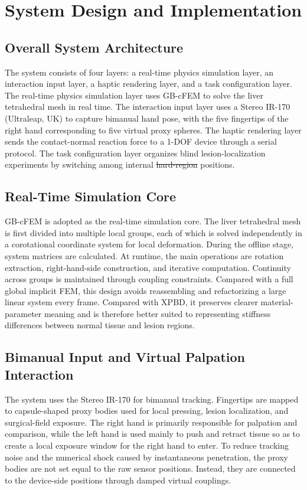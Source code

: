 \documentclass{ieeeaccess}
\makeatletter
\providecommand{\DIFadd}[1]{{\protect\color{blue}\uwave{#1}}} %
\providecommand{\DIFdel}[1]{{\protect\color{red}\sout{#1}}} %
\providecommand{\DIFaddbegin}{} %
\providecommand{\DIFaddend}{} %
\providecommand{\DIFdelbegin}{} %
\providecommand{\DIFdelend}{} %
\newcommand{\DIFscaledelfig}{0.5}
\newlength{\DIFdelgraphicswidth} %
\newlength{\DIFdelgraphicsheight} %
\newcommand{\DIFaddincludegraphics}[2][]{{\color{blue}\fbox{\DIFOincludegraphics[#1]{#2}}}} %
\newcommand{\DIFdelincludegraphics}[2][]{%
\sbox{\DIFdelgraphicsbox}{\DIFOincludegraphics[#1]{#2}}%
\settoboxwidth{\DIFdelgraphicswidth}{\DIFdelgraphicsbox} %
\settoboxtotalheight{\DIFdelgraphicsheight}{\DIFdelgraphicsbox} %
\scalebox{\DIFscaledelfig}{%
\parbox[b]{\DIFdelgraphicswidth}{\usebox{\DIFdelgraphicsbox}\\[-\baselineskip] \rule{\DIFdelgraphicswidth}{0em}}\llap{\resizebox{\DIFdelgraphicswidth}{\DIFdelgraphicsheight}{%
\setlength{\unitlength}{\DIFdelgraphicswidth}%
\begin{picture}(1,1)%
\thicklines\linethickness{2pt} %
{\color[rgb]{1,0,0}\put(0,0){\framebox(1,1){}}}%
{\color[rgb]{1,0,0}\put(0,0){\line( 1,1){1}}}%
{\color[rgb]{1,0,0}\put(0,1){\line(1,-1){1}}}%
\end{picture}%
}\hspace*{3pt}}} %
} %
\DeclareRobustCommand{\DIFaddbegin}{\DIFOaddbegin \let\includegraphics\DIFaddincludegraphics} %
\DeclareRobustCommand{\DIFaddend}{\DIFOaddend \let\includegraphics\DIFOincludegraphics} %
\DeclareRobustCommand{\DIFdelbegin}{\DIFOdelbegin \let\includegraphics\DIFdelincludegraphics} %
\DeclareRobustCommand{\DIFdelend}{\DIFOaddend \let\includegraphics\DIFOincludegraphics} %
\let\sout@orig\sout %
\renewcommand{\sout}[1]{\ifmmode\text{\sout@orig{\ensuremath{#1}}}\else\sout@orig{#1}\fi} %
\makeatother
\begin{document}
\section{System Design and Implementation}
\subsection{Overall System Architecture}
The system consists of four layers: a real-time physics simulation layer, an interaction input layer, a haptic rendering layer, and a task configuration layer. The real-time physics simulation layer uses GB-cFEM to solve the liver tetrahedral mesh in real time. The interaction input layer uses a Stereo IR-170 (Ultraleap, UK) to capture bimanual hand pose, with the five fingertips of the right hand corresponding to five virtual proxy spheres. The haptic rendering layer sends the contact-normal reaction force to a 1-DOF device through a serial protocol. The task configuration layer organizes blind lesion-localization experiments by switching among internal \DIFdelbegin \DIFdel{hard-region }\DIFdelend \DIFaddbegin \DIFadd{lesion }\DIFaddend positions.

\subsection{Real-Time Simulation Core}
GB-cFEM is adopted as the real-time simulation core. The liver tetrahedral mesh is first divided into multiple local groups, each of which is solved independently in a corotational coordinate system for local deformation. During the offline stage, system matrices are calculated. At runtime, the main operations are rotation extraction, right-hand-side construction, and iterative computation. Continuity across groups is maintained through coupling constraints. Compared with a full global implicit FEM, this design avoids reassembling and refactorizing a large linear system every frame. Compared with XPBD, it preserves clearer material-parameter meaning and is therefore better suited to representing stiffness differences between normal tissue and lesion regions.

\subsection{Bimanual Input and Virtual Palpation Interaction}
The system uses the Stereo IR-170 for bimanual tracking. Fingertips are mapped to capsule-shaped proxy bodies used for local pressing, lesion localization, and surgical-field exposure. The right hand is primarily responsible for palpation and comparison, while the left hand is used mainly to push and retract tissue so as to create a local exposure window for the right hand to enter. To reduce tracking noise and the numerical shock caused by instantaneous penetration, the proxy bodies are not set equal to the raw sensor positions. Instead, they are connected to the device-side positions through damped virtual couplings.
\end{document}
